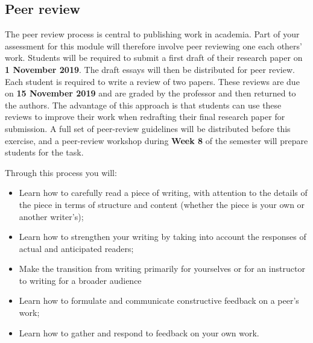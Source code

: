 

\subsection*{Peer review}


	The peer review process is central to publishing work in academia. Part of your assessment for this module will therefore involve peer reviewing one each others' work. Students will be required to submit a first draft of their research paper on \textbf{1 November 2019}. The draft essays will then be distributed for peer review. Each student is required to write a review of two papers. These reviews are due on \textbf{15 November 2019} and are  graded by the professor and then returned to the authors. The advantage of this approach is that students can use these reviews to improve their work when redrafting their final research paper for submission. A full set of peer-review guidelines will be distributed before this exercise, and a peer-review workshop during \textbf{Week 8} of the semester will prepare students for the task.

Through this process you will:

\begin{itemize}
	\item Learn how to carefully read a piece of writing, with attention to the details of the piece in terms of structure and content (whether the piece is your own or another writer's);
	\item Learn how to strengthen your writing by taking into account the responses of actual and anticipated readers;
	\item Make the transition from writing primarily for yourselves or for an instructor to writing for a broader audience
	\item Learn how to formulate and communicate constructive feedback on a peer's work;
	\item Learn how to gather and respond to feedback on your own work.
\end{itemize}

